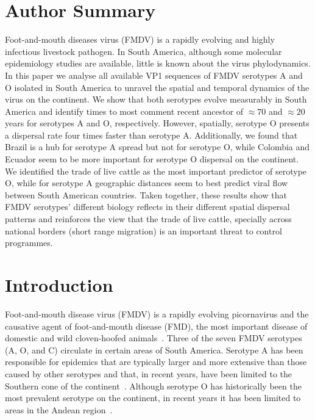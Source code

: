 \documentclass[10pt]{article}
\begin{document}
\section*{Author Summary} %
Foot-and-mouth diseases virus (FMDV) 
is a rapidly evolving and highly infectious livestock pathogen.
In South America, although some molecular epidemiology studies are available, little is known about the virus phylodynamics.
In this paper we analyse all available VP1 sequences of FMDV serotypes A and O isolated in South America to unravel the spatial and temporal dynamics of the virus on the continent.
We show that both serotypes evolve measurably in South America and identify times to most comment recent ancestor of $\approx 70$ and $\approx 20$ years for serotypes A and O, respectively. 
However, spatially, serotype O presents a dispersal rate four times faster than serotype A.
Additionally, we found that Brazil is a hub for serotype A spread but not for serotype O, while Colombia and Ecuador seem to be more important for serotype O dispersal on the continent.
We identified the trade of live cattle as the most important predictor of serotype O, while for serotype A geographic distances seem to best predict viral flow between South American countries.
Taken together, these results show that FMDV serotypes' different biology reflects in their different spatial dispersal patterns and reinforces the view that the trade of live cattle, specially across national borders (short range migration) is an important threat to control programmes.   

\section*{Introduction}

Foot-and-mouth disease virus (FMDV) is a rapidly evolving picornavirus and the causative agent of foot-and-mouth disease (FMD), the most important disease of domestic and wild cloven-hoofed animals~\cite{review}.
Three of the seven FMDV serotypes (A, O, and C) circulate in certain areas of South America.
Serotype A has been responsible for epidemics that are typically larger and more extensive than those caused by other serotypes and that, in recent years, have been limited to the 
Southern cone of the continent~\cite{Perez2001, Malirat2012}.
Although serotype O has historically been the most prevalent serotype on the continent, in recent years it has been limited to areas in the Andean region~\cite{andean}.
\end{document}
